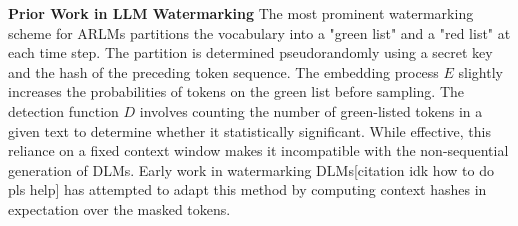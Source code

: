   \textbf{Prior Work in LLM Watermarking}
  The most prominent watermarking scheme for ARLMs \cite{kirchenbauer2023} partitions the vocabulary into a "green list" and a "red list" at each time step. The partition is determined pseudorandomly using a secret key and the hash of the preceding token sequence. The embedding process \(E\) slightly increases the probabilities of tokens on the green list before sampling. The detection function \(D\) involves counting the number of green-listed tokens in a given text to determine whether it statistically significant. While effective, this reliance on a fixed context window makes it incompatible with the non-sequential generation of DLMs. Early work in watermarking DLMs[citation idk how to do pls help] has attempted to adapt this method by computing context hashes in expectation over the masked tokens.
